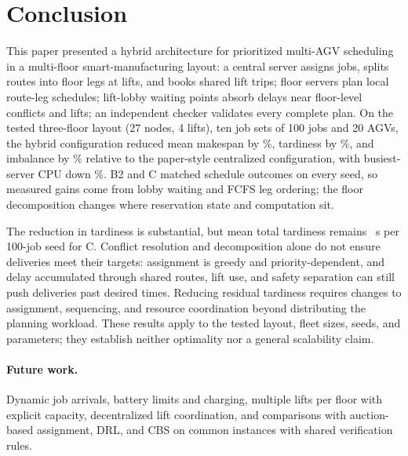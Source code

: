 \section{Conclusion}
\label{sec:conclusion}

This paper presented a hybrid architecture for prioritized multi-AGV scheduling in a multi-floor smart-manufacturing layout: a central server assigns jobs, splits routes into floor legs at lifts, and books shared lift trips; floor servers plan local route-leg schedules; lift-lobby waiting points absorb delays near floor-level conflicts and lifts; an independent checker validates every complete plan. On the tested three-floor layout (27 nodes, 4 lifts), ten job sets of 100 jobs and 20 AGVs, the hybrid configuration reduced mean makespan by \RedMakespanCAabs\%, tardiness by \RedTardinessCAabs\%, and imbalance by \RedImbalanceCAabs\% relative to the paper-style centralized configuration, with busiest-server CPU down \RedCpuMaxCAabs\%. B2 and C matched schedule outcomes on every seed, so measured gains come from lobby waiting and FCFS leg ordering; the floor decomposition changes where reservation state and computation sit.

The reduction in tardiness is substantial, but mean total tardiness remains \TardinessC~s per 100-job seed for C. Conflict resolution and decomposition alone do not ensure deliveries meet their targets: assignment is greedy and priority-dependent, and delay accumulated through shared routes, lift use, and safety separation can still push deliveries past desired times. Reducing residual tardiness requires changes to assignment, sequencing, and resource coordination beyond distributing the planning workload. These results apply to the tested layout, fleet sizes, seeds, and parameters; they establish neither optimality nor a general scalability claim.

\paragraph{Future work.} Dynamic job arrivals, battery limits and charging, multiple lifts per floor with explicit capacity, decentralized lift coordination, and comparisons with auction-based assignment, DRL, and CBS on common instances with shared verification rules.
